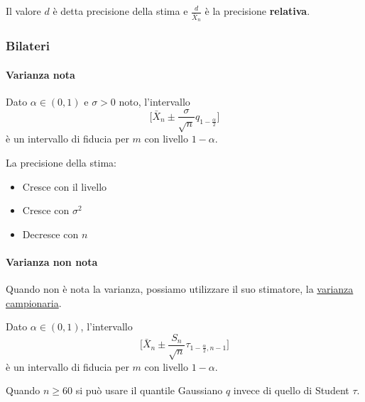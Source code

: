 \begin{definition}
	Il valore $d$ è detta precisione della stima e $\frac{d}{\bar{X}_n}$ è la precisione \textbf{relativa}.
\end{definition}

\subsubsection{Bilateri}
\paragraph{Varianza nota}
\begin{definition}
	Dato $\alpha \in (0,1)$ e $\sigma >0$ noto, l'intervallo
	\begin{equation}
		\bigg[\bar{X}_n \pm \frac{\sigma}{\sqrt{n}}q_{1-\frac{\alpha}{2}}\bigg]
	\end{equation}
	è un intervallo di fiducia per $m$ con livello $1-\alpha$.
\end{definition}

\begin{observation}
	La precisione della stima:
	\begin{itemize}
		\item Cresce con il livello
		\item Cresce con $\sigma^2$
		\item Decresce con $n$
	\end{itemize}
\end{observation}

\paragraph{Varianza non nota}
Quando non è nota la varianza, possiamo utilizzare il suo stimatore, la \hyperref[eq:varcamp]{varianza campionaria}.

\begin{definition}
	Dato $\alpha \in (0,1)$, l'intervallo
	\begin{equation}
		\bigg[\bar{X}_n \pm \frac{S_n}{\sqrt{n}}\tau_{1-\frac{\alpha}{2},n-1}\bigg]
	\end{equation}
	è un intervallo di fiducia per $m$ con livello $1-\alpha$.
\end{definition}

\begin{note}
	Quando $n \geq 60$ si può usare il quantile Gaussiano $q$ invece di quello di Student $\tau$.
\end{note}

